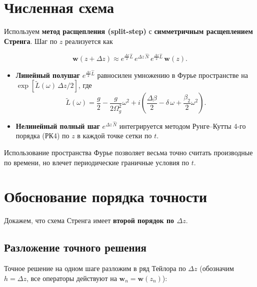 \documentclass{article}
\begin{document}
\section{Численная схема}

Используем \textbf{метод расщепления (split-step)} с \textbf{симметричным расщеплением Стренга}. Шаг по \(z\) реализуется как

\begin{equation}
    \mathbf{w}(z+\Delta z) \approx e^{\frac{\Delta z}{2}\hat L}\, e^{\Delta z\, \hat N}\, e^{\frac{\Delta z}{2}\hat L}\, \mathbf{w}(z).
    \tag{5}
\end{equation}

\begin{itemize}
    \item \textbf{Линейный полушаг} \(e^{\frac{\Delta z}{2}\hat L}\) равносилен умножению в Фурье пространстве на \(\exp[\tilde L(\omega)\,\Delta z/2]\), где
          \begin{equation}
              \tilde L(\omega) = \frac{g}{2} - \frac{g}{2\Omega_g^2}\omega^2 + i\left(\frac{\Delta\beta}{2} - \delta\,\omega + \frac{\beta_2}{2}\omega^2\right).
          \end{equation}
    \item \textbf{Нелинейный полный шаг} \(e^{\Delta z\,\hat N}\) интегрируется методом Рунге--Кутты 4-го порядка (РК4) по \(z\) в каждой точке сетки по \(t\).
\end{itemize}

Использование пространства Фурье позволяет весьма точно считать производные по времени, но влечет периодические граничные условия по \(t\).

\section{Обоснование порядка точности}

Докажем, что схема Стренга имеет \textbf{второй порядок по \(\Delta z\)}.

\subsection{Разложение точного решения}

Точное решение на одном шаге разложим в ряд Тейлора по \(\Delta z\) (обозначим \(h=\Delta z\), все операторы действуют на \(\mathbf{w}_n=\mathbf{w}(z_n)\)):
\end{document}
